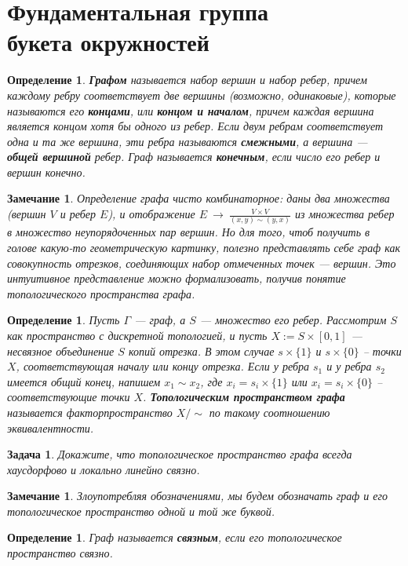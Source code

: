 \documentclass[12pt]{book}
\newcommand{\arrow}{{\:\longrightarrow\:}}
\theoremstyle{upshape}
\newtheorem{zadacha}{Задача}[chapter]
\theoremstyle{generic}
\newtheorem{opredelenie}[teorema]{Определение}
\newtheorem{remark}[teorema]{Замечание}
\def\замечание{\begin{remark}}
\def\еза{\end{remark}}
\theoremstyle{upshapenonumber}
\newcommand{\следствие}{%
     \refstepcounter{teorema}
     {\noindent\bf Следствие \thechapter.\arabic{teorema}:\ }}
\newcommand{\пример}{%
     \refstepcounter{teorema}
     {\noindent\bf Пример \thechapter.\arabic{teorema}:\ }}
\newcommand{\лемма}{%
     \refstepcounter{teorema}
     {\noindent\bf Лемма \thechapter.\arabic{teorema}:\ }}
\newcommand{\теорема}{%
     \refstepcounter{teorema}
     {\noindent\bf Теорема \thechapter.\arabic{teorema}:\ }}
\newcommand{\утверждение}{%
     \refstepcounter{teorema}
     {\noindent\bf Утверждение \thechapter.\arabic{teorema}:\ }}
\def\бф{\bf}
\def\ем{\em}
\def\задача{\begin{zadacha}}
\def\ез{\end{zadacha}}
\def\еу{\end{ukazanie}}
\def\определение{\begin{opredelenie}}
\def\ео{\end{opredelenie}}
\def\енум{\begin{enumerate}}
\def\ее{\end{enumerate}}
\begin{document}

\section[Фундаментальная группа 
букета окружностей]{Фундаментальная группа \\букета окружностей}


\определение
{\бф Графом} называется набор вершин и набор ребер,
причем каждому ребру соответствует две вершины
(возможно, одинаковые), которые называются его {\бф
концами}, или {\бф концом и началом}, причем
каждая вершина является концом хотя бы одного из ребер.
Если двум ребрам соответствует одна и та
же вершина, эти ребра называются {\бф смежными},
а вершина --- {\бф общей вершиной} ребер.
Граф называется {\бф конечным}, если число
его ребер и вершин конечно.
\ео

\замечание
Определение графа чисто комбинаторное:
даны два множества (вершин $V$ и ребер $E$), и отображение
$E \arrow \frac{V \times V}{(x,y)\sim (y,x)}$ из множества 
ребер в множество  неупорядоченных пар вершин.  Но для
того, чтоб получить в голове какую-то геометрическую
картинку, полезно представлять себе граф как совокупность 
отрезков, соединяющих набор отмеченных точек --- вершин.
Это интуитивное представление можно формализовать,
получив понятие {\ем топологического пространства графа}.
\еза

\определение
Пусть $\Gamma$ --- граф, а $S$ --- множество его ребер.
Рассмотрим $S$ как пространство с дискретной топологией,
и пусть $X:= S \times [0,1]$ --- несвязное объединение
$S$ копий отрезка. В этом случае $s \times \{1\}$ и $s \times \{0\}$ --
точки $X$, соответствующая началу или концу отрезка.
Если у ребра $s_1$ и у ребра $s_2$ имеется общий конец, напишем
$x_1\sim x_2$, где $x_i= s_i \times \{1\}$ или $x_i= s_i \times \{0\}$
-- соответствующие точки $X$. {\бф Топологическим
пространством графа} называется факторпространство
$X/\sim$ по такому соотношению эквивалентности.
\ео

\задача
Докажите, что топологическое пространство графа всегда
хаусдорфово и локально линейно связно.
\ез

\замечание
Злоупотребляя обозначениями,
мы будем обозначать граф и его топологическое
пространство одной и той же буквой.
\еза

\определение
Граф называется {\бф связным}, если его топологическое
пространство связно.
\ео
\end{document}

